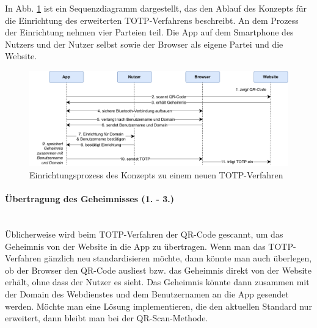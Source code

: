 In Abb. \ref{fig: konzept setup} ist ein Sequenzdiagramm dargestellt, das den Ablauf des Konzepts für 
die Einrichtung des erweiterten TOTP-Verfahrens beschreibt. An dem Prozess der Einrichtung nehmen vier Parteien teil. Die App auf dem Smartphone des Nutzers und der Nutzer selbst sowie der Browser als eigene Partei und die Website.

\begin{figure}
    \centering
    \includegraphics[width=1\linewidth]{figures/konzept_setup.pdf}
    \caption[Einrichtungsprozess des Konzepts zu einem neuen TOTP-Verfahren]{Einrichtungsprozess des Konzepts zu einem neuen TOTP-Verfahren}
    \label{fig: konzept setup}
\end{figure}

\paragraph*{Übertragung des Geheimnisses (1. - 3.)}
\mbox{} \vspace{0.1cm} \\
Üblicherweise wird beim TOTP-Verfahren der QR-Code gescannt, um das Geheimnis von 
der Website in die App zu übertragen. Wenn man das TOTP-Verfahren gänzlich neu 
standardisieren möchte, dann könnte man auch überlegen, ob der Browser den 
QR-Code ausliest bzw. das Geheimnis direkt von der Website erhält, ohne dass der 
Nutzer es sieht. Das Geheimnis könnte dann zusammen mit der Domain des 
Webdienstes und dem Benutzernamen an die App gesendet werden. Möchte man eine 
Lösung implementieren, die den aktuellen Standard nur erweitert, dann bleibt man 
bei der QR-Scan-Methode.

